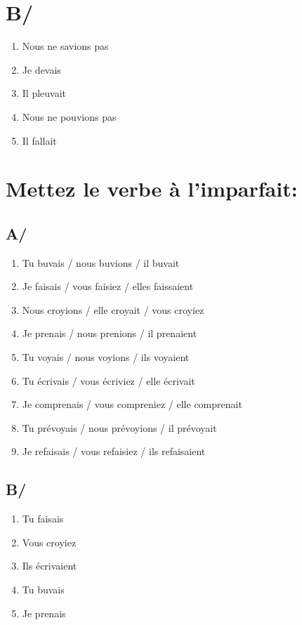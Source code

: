\section{B/}

\begin{enumerate}
    \item Nous ne savions pas 
    \item Je devais 
    \item Il pleuvait 
    \item Nous ne pouvions pas 
    \item Il fallait
\end{enumerate}

\section{Mettez le verbe à l'imparfait:}

\subsection{A/}

\begin{enumerate}
    \item Tu buvais / nous buvions / il buvait
    \item Je faisais / vous faisiez / elles faissaient
    \item Nous croyions / elle croyait / vous croyiez
    \item Je prenais / nous prenions / il prenaient
    \item Tu voyais / nous voyions / ils voyaient
    \item Tu écrivais / vous écriviez / elle écrivait
    \item Je comprenais / vous compreniez / elle comprenait 
    \item Tu prévoyais / nous prévoyions / il prévoyait
    \item Je refaisais / vous refaisiez / ils refaisaient
\end{enumerate}

\subsection{B/}

\begin{enumerate}
    \item Tu faisais
    \item Vous croyiez 
    \item Ils écrivaient
    \item Tu buvais 
    \item Je prenais 
\end{enumerate}

